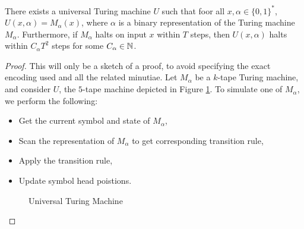 \begin{thm}
    There exists a universal Turing machine $U$ such that foor all $x, \alpha \in \{0, 1\}^{*}$, $U(x, \alpha) = M_{\alpha}(x)$, where $\alpha$ is a binary representation of the Turing machine $M_{\alpha}$. Furthermore, if $M_{\alpha}$ halts on input $x$ within $T$ steps, then $U(x, \alpha)$ halts within $C_{\alpha}T^2$ steps for some $C_{\alpha} \in \mathbb{N}$.
\end{thm}

\begin{proof}
    This will only be a sketch of a proof, to avoid specifying the exact encoding used and all the related minutiae. Let $M_{\alpha}$ be a $k$-tape Turing machine, and consider $U$, the $5$-tape machine depicted in Figure \ref{fig:universal-turing-machine}. To simulate one of $M_{\alpha}$, we perform the following:
    \begin{itemize}
        \item Get the current symbol and state of $M_{\alpha}$,
        \item Scan the representation of $M_{\alpha}$ to get corresponding transition rule,
        \item Apply the transition rule,
        \item Update symbol head poistions.
    \end{itemize}

    \begin{figure}[ht!]
        \centering
        \caption{Universal Turing Machine}
        \label{fig:universal-turing-machine}
    \end{figure}
\end{proof}

